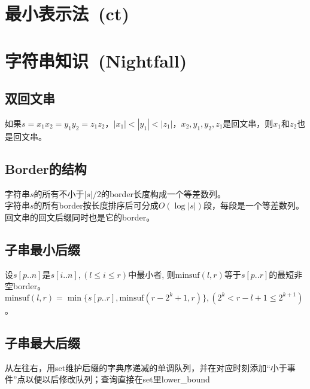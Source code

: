 \section{最小表示法~\small(ct)}

\section{字符串知识~\small(Nightfall)}
    \subsection*{双回文串}
        如果$ s = x_1 x_2 = y_1 y_2 = z_1 z_2 $，$ \left|x_1\right| < \left|y_1\right| < \left|z_1\right| $，$ x_2, y_1, y_2, z_1 $是回文串，则$ x_1 $和$ z_2 $也是回文串。
    \subsection*{Border的结构}
        字符串$ s $的所有不小于$ \left|s\right| / 2 $的border长度构成一个等差数列。
        \\字符串$ s $的所有border按长度排序后可分成$ O(\log \left| s \right|) $段，每段是一个等差数列。
        \\回文串的回文后缀同时也是它的border。
    \subsection*{子串最小后缀}
        设$ s[p..n] $是$ s[i..n], (l \leq i \leq r) $中最小者, 则$ \text{minsuf}(l, r) $等于$ s[p..r] $的最短非空border。$ \text{minsuf}(l, r) = \min \lbrace s[p..r], \text{minsuf}(r - 2^k + 1, r) \rbrace, (2^k < r - l + 1 \leq 2^{k + 1} ) $。
    \subsection*{子串最大后缀}
        从左往右，用set维护后缀的字典序递减的单调队列，并在对应时刻添加“小于事件”点以便以后修改队列；查询直接在set里lower\_bound
